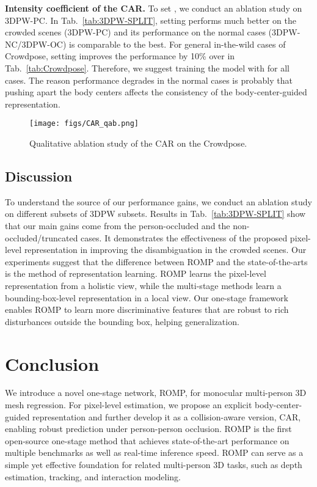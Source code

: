 \documentclass[10pt,twocolumn,letterpaper]{article}
\begin{document}
\textbf{Intensity coefficient  of the CAR. }
To set , we conduct an ablation study on 3DPW-PC.
In Tab.~\ref{tab:3DPW-SPLIT}, setting  performs much better on the crowded scenes (3DPW-PC) and its performance on the normal cases (3DPW-NC/3DPW-OC) is comparable to the best. 
For general in-the-wild cases of Crowdpose, setting  improves the performance by 10\%  over  in Tab.~\ref{tab:Crowdpose}.
Therefore, we suggest training the model with  for all cases.
The reason performance degrades in the normal cases is probably that pushing apart the body centers affects the consistency of the body-center-guided representation.

\begin{figure}[t]
	\centering
	\texttt{[image: figs/CAR\_qab.png]}
	\caption{Qualitative ablation study of the CAR on the Crowdpose.}
	\label{fig:CAR_qab}
\end{figure}
\vspace{-1mm}
\subsection{Discussion}
\vspace{-1mm}
To understand the source of our performance gains, we conduct an ablation study on different subsets of 3DPW subsets. 
Results in Tab.~\ref{tab:3DPW-SPLIT} show that our main gains come from the person-occluded and the non-occluded/truncated cases.
It demonstrates the effectiveness of the proposed pixel-level representation in improving the disambiguation in the crowded scenes.
Our experiments suggest that the difference between ROMP and the state-of-the-arts~\cite{jiang2020coherent,kocabas2020vibe,kolotouros2019spin} is the method of representation learning. 
ROMP learns the pixel-level representation from a holistic view, while the multi-stage methods learn a bounding-box-level representation in a local view.
Our one-stage framework enables ROMP to learn more discriminative features that are robust to rich disturbances outside the bounding box, helping generalization. 

\vspace{-1mm}
\section{Conclusion}
\vspace{-1mm}
We introduce a novel one-stage network, ROMP, for monocular multi-person 3D mesh regression. 
For pixel-level estimation, we propose an explicit body-center-guided representation and further develop it as a collision-aware version, CAR, enabling robust prediction under person-person occlusion. 
ROMP is the first open-source one-stage method that achieves state-of-the-art performance on multiple benchmarks as well as real-time inference speed.
ROMP can serve as a simple yet effective foundation for related multi-person 3D tasks, such as depth estimation, tracking, and interaction modeling. 
\end{document}
